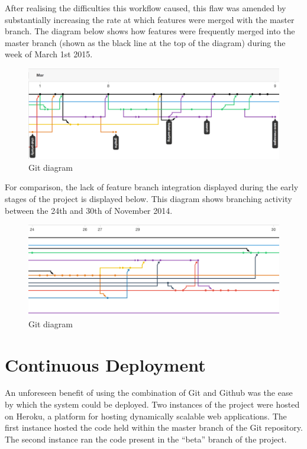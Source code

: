 \documentclass[a4paper]{l3proj}
\begin{document}
After realising the difficulties this workflow caused, this flaw was amended by substantially increasing the rate at which features were merged with the master branch. The diagram below shows how features were frequently merged into the master branch (shown as the black line at the top of the diagram) during the week of March 1st 2015. \\

\begin{figure}[ht]
\centering
\includegraphics[scale=0.5]{diagram}
\caption{Git diagram}
\end{figure} 
 
 For comparison, the lack of feature branch integration displayed during the early stages of the project is displayed below. This diagram shows branching activity between the 24th and 30th of November 2014. 

\begin{figure}[ht]
\centering
\includegraphics[scale=0.5]{diagram2}
\caption{Git diagram}
\end{figure} 

\section{Continuous Deployment}
\label{deployment}

An unforeseen benefit of using the combination of Git and Github was the ease by which the system could be deployed. Two instances of the project were hosted on Heroku, a platform for hosting dynamically scalable web applications. The first instance hosted the code held within the master branch of the Git repository. The second instance ran the code present in the “beta” branch of the project.
\end{document}
